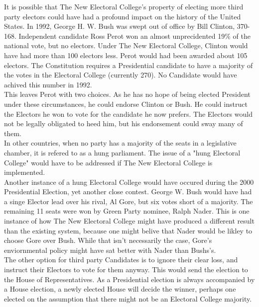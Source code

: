 \documentclass{article}
\begin{document}
    It is possible that The New Electoral College's property of electing more third party electors could have had a profound impact on the history of the United States. In 1992, George H. W. Bush was swept out of office by Bill Clinton, 370-168. Independent candidate Ross Perot won an almost unprecidented 19\% of the national vote, but no electors. Under The New Electoral College, Clinton would have had more than 100 electors less. Perot would had been awarded about 105 electors. The Constitution requires a Presidential candidate to have a majority of the votes in the Electoral College (currently 270). No Candidate would have achived this number in 1992.\\
    
    This leaves Perot with two choices. As he has no hope of being elected President under these circumstances, he could endorse Clinton or Bush. He could instruct the Electors he won to vote for the candidate he now prefers. The Electors would not be legally obligated to heed him, but his endorsement could sway many of them.\\
    
    In other countries, when no party has a majority of the seats in a legislative chamber, it is refered to as a hung parliament. The issue of a "hung Electoral College" would have to be addressed if The New Electoral College is implemented.\\
    
    Another instance of a hung Electoral College would have occured during the 2000 Presidential Election, yet another close contest. George W. Bush would have had a singe Elector lead over his rival, Al Gore, but six votes short of a majority. The remaining 11 seats were won by Green Party nominee, Ralph Nader. This is one instance of how The New Electoral College might have produced a different result than the existing system, because one might belive that Nader would be likley to choose Gore over Bush. While that isn't necessarily the case, Gore's enviornmental policy might have sat better with Nader than Bushs's.\\

    The other option for third party Candidates is to ignore their clear loss, and instruct their Electors to vote for them anyway. This would send the election to the House of Representatives. As a Presidential election is always accompanied by a House election, a newly elected House will decide the winner, perhaps one elected on the assumption that there might not be an Electoral College majority.\\
\end{document}
